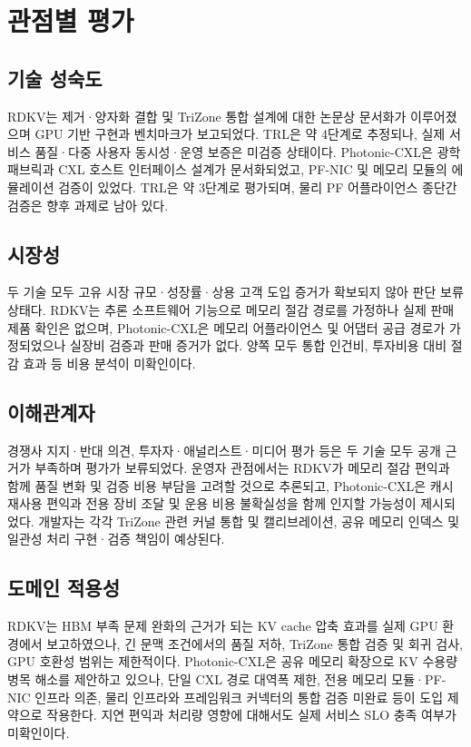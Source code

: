 \documentclass[11pt,a4paper]{article}
\begin{document}
\section{관점별 평가}

\subsection{기술 성숙도}
RDKV는 제거·양자화 결합 및 TriZone 통합 설계에 대한 논문상 문서화가 이루어졌으며 GPU 기반 구현과 벤치마크가 보고되었다. TRL은 약 4단계로 추정되나, 실제 서비스 품질·다중 사용자 동시성·운영 보증은 미검증 상태이다. Photonic-CXL은 광학 패브릭과 CXL 호스트 인터페이스 설계가 문서화되었고, PF-NIC 및 메모리 모듈의 에뮬레이션 검증이 있었다. TRL은 약 3단계로 평가되며, 물리 PF 어플라이언스 종단간 검증은 향후 과제로 남아 있다.

\subsection{시장성}
두 기술 모두 고유 시장 규모·성장률·상용 고객 도입 증거가 확보되지 않아 판단 보류 상태다. RDKV는 추론 소프트웨어 기능으로 메모리 절감 경로를 가정하나 실제 판매 제품 확인은 없으며, Photonic-CXL은 메모리 어플라이언스 및 어댑터 공급 경로가 가정되었으나 실장비 검증과 판매 증거가 없다. 양쪽 모두 통합 인건비, 투자비용 대비 절감 효과 등 비용 분석이 미확인이다.

\subsection{이해관계자}
경쟁사 지지·반대 의견, 투자자·애널리스트·미디어 평가 등은 두 기술 모두 공개 근거가 부족하며 평가가 보류되었다. 운영자 관점에서는 RDKV가 메모리 절감 편익과 함께 품질 변화 및 검증 비용 부담을 고려할 것으로 추론되고, Photonic-CXL은 캐시 재사용 편익과 전용 장비 조달 및 운용 비용 불확실성을 함께 인지할 가능성이 제시되었다. 개발자는 각각 TriZone 관련 커널 통합 및 캘리브레이션, 공유 메모리 인덱스 및 일관성 처리 구현·검증 책임이 예상된다.

\subsection{도메인 적용성}
RDKV는 HBM 부족 문제 완화의 근거가 되는 KV cache 압축 효과를 실제 GPU 환경에서 보고하였으나, 긴 문맥 조건에서의 품질 저하, TriZone 통합 검증 및 회귀 검사, GPU 호환성 범위는 제한적이다. Photonic-CXL은 공유 메모리 확장으로 KV 수용량 병목 해소를 제안하고 있으나, 단일 CXL 경로 대역폭 제한, 전용 메모리 모듈·PF-NIC 인프라 의존, 물리 인프라와 프레임워크 커넥터의 통합 검증 미완료 등이 도입 제약으로 작용한다. 지연 편익과 처리량 영향에 대해서도 실제 서비스 SLO 충족 여부가 미확인이다.
\end{document}
